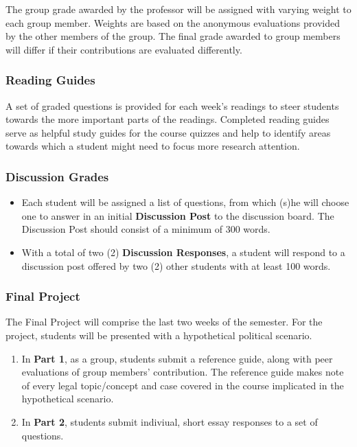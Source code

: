 \documentclass[10pt,]{article}
\providecommand{\tightlist}{%
  \setlength{\itemsep}{0pt}\setlength{\parskip}{0pt}}
\begin{document}
The group grade awarded by the professor will be assigned with varying
weight to each group member. Weights are based on the anonymous
evaluations provided by the other members of the group. The final grade
awarded to group members will differ if their contributions are
evaluated differently.

\hypertarget{reading-guides}{%
\subsubsection{Reading Guides}\label{reading-guides}}

A set of graded questions is provided for each week's readings to steer
students towards the more important parts of the readings. Completed
reading guides serve as helpful study guides for the course quizzes and
help to identify areas towards which a student might need to focus more
research attention.

\hypertarget{discussion-grades}{%
\subsubsection{Discussion Grades}\label{discussion-grades}}

\begin{itemize}
\tightlist
\item
  Each student will be assigned a list of questions, from which (s)he
  will choose one to answer in an initial \textbf{Discussion Post} to
  the discussion board. The Discussion Post should consist of a minimum
  of 300 words.
\item
  With a total of two (2) \textbf{Discussion Responses}, a student will
  respond to a discussion post offered by two (2) other students with at
  least 100 words.
\end{itemize}

\hypertarget{final-project}{%
\subsubsection{Final Project}\label{final-project}}

The Final Project will comprise the last two weeks of the semester. For
the project, students will be presented with a hypothetical political
scenario.

\begin{enumerate}
\def\labelenumi{\arabic{enumi}.}
\tightlist
\item
  In \textbf{Part 1}, as a group, students submit a reference guide,
  along with peer evaluations of group members' contribution. The
  reference guide makes note of every legal topic/concept and case
  covered in the course implicated in the hypothetical scenario.
\item
  In \textbf{Part 2}, students submit indiviual, short essay responses
  to a set of questions.
\end{enumerate}
\end{document}
